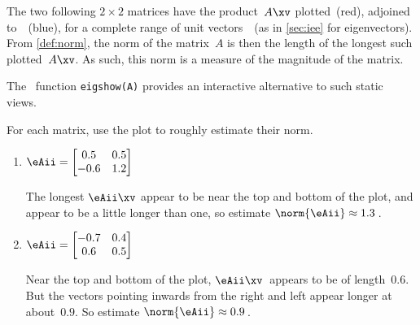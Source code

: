 \begin{example} \label{eg:}
The two following \(2\times2\) matrices have the product~\(A\xv\) plotted~(red), adjoined to~\xv~(blue), for a complete range of unit vectors~\xv\ (as in \autoref{sec:iee} for eigenvectors).
From \autoref{def:norm}, the norm of the matrix~\(A\) is then the length of the longest such plotted~\(A\xv\).
As such, this norm is a measure of the magnitude of the matrix.
\begin{aside}
The \script[1]\ function \texttt{eigshow(A)} provides an interactive alternative to such static views.
\end{aside}%
For each matrix, use the plot to roughly estimate their norm.
\begin{enumerate}
\item\label{eg:g2x2norm:a} \(\eAii=\begin{bmatrix} 0.5&0.5\\-0.6&1.2 \end{bmatrix}\)\\
\begin{solution} 
The longest \(\eAii\xv\) appear to be near the top and bottom of the plot, and appear to be a little longer than one, so estimate \(\norm{\eAii}\approx 1.3\)\,.
\end{solution}

\item \(\eAii=\begin{bmatrix} {-0.7}&{0.4}\\{0.6}&{0.5} \end{bmatrix}\)\\
\begin{solution} 
Near the top and bottom of the plot, \(\eAii\xv\)~appears to be of length~\(0.6\).   
But the vectors pointing inwards from the right and left appear  longer at about~\(0.9\). 
So estimate \(\norm{\eAii}\approx 0.9\)\,.
\end{solution}

\end{enumerate}
\end{example}




